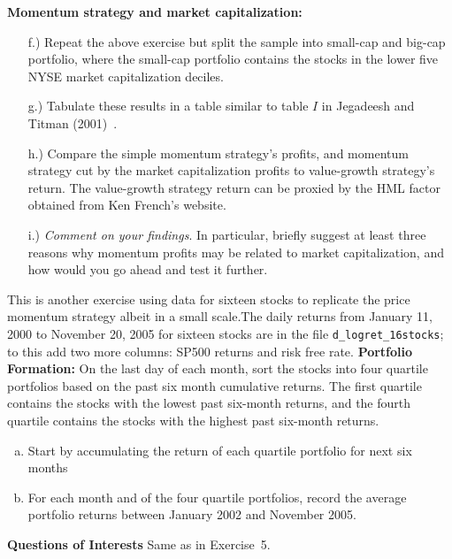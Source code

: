 \textbf{Momentum strategy and market capitalization:}
	\begin{enumerate}
	\item[f.)] Repeat the above exercise but split the sample into small-cap and big-cap portfolio, where the small-cap portfolio contains the stocks in the lower five NYSE market capitalization deciles.
	\item[g.)] Tabulate these results in a table similar to table $I$ in Jegadeesh
and Titman (2001)~\cite{JeTi}.
	\item[h.)] Compare the simple momentum strategy's profits, and momentum strategy cut by the market capitalization profits to value-growth strategy's return. The value-growth strategy return can be proxied by the HML factor obtained from Ken French's website.
	\item[i.)] \emph{Comment on your findings}. In particular, briefly suggest at least three reasons why momentum profits may be related to market capitalization, and how would you go ahead and test it further. \twomedskip
	\end{enumerate}


\prob This is another exercise using data for sixteen stocks to replicate the price momentum strategy albeit in a small scale.The daily returns from January 11, 2000 to November 20, 2005 for sixteen stocks are in the file \texttt{d\_logret\_16stocks};
to this add two more columns: SP500 returns and risk free rate.
    \textbf{Portfolio Formation:} \hfill \break
    On the last day of each month, sort the stocks into four quartile portfolios based on the past six month
cumulative returns. The first quartile contains the stocks with the lowest past six-month returns, and the
fourth quartile contains the stocks with the highest past six-month returns.
        \begin{enumerate}[(a)]
        \item Start by accumulating the return of each quartile portfolio for next six months
        \item For each month and of the four quartile portfolios, record the average portfolio returns between January 2002 and November 2005.
        \end{enumerate}
    \textbf{Questions of Interests} \hfill \break
    Same as in Exercise~5. \twomedskip


